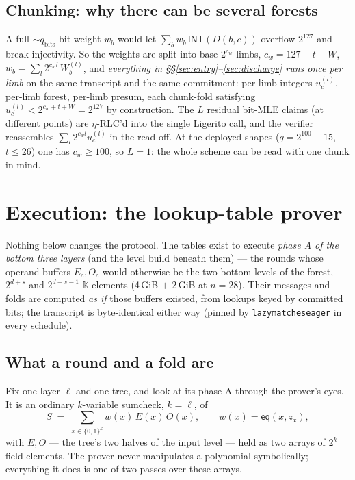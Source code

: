 \documentclass[11pt]{article}
\newcommand{\K}{\mathbb{K}}            %
\newcommand{\bits}{\{0,1\}}
\newcommand{\INT}{\mathsf{INT}}
\newcommand{\eq}{\mathsf{eq}}
\newcommand{\cw}{c_w}
\newcommand{\code}[1]{{\def\_{\textunderscore\allowbreak}\texttt{#1}}}
\theoremstyle{definition}
\begin{document}
\subsection{Chunking: why there can be several forests}
\label{sec:chunks}

A full ${\sim}q_{\mathrm{bits}}$-bit weight $w_b$ would let
$\sum_b w_b\,\INT(D(b,c))$ overflow $2^{127}$ and break injectivity.  So
the weights are split into base-$2^{\cw}$ limbs, $\cw = 127 - t - W$,
$w_b = \sum_l 2^{\cw l}\, W^{(l)}_b$, and \emph{everything in
\S\S\ref{sec:entry}--\ref{sec:discharge} runs once per limb} on the same
transcript and the same commitment: per-limb integers $u^{(l)}_c$,
per-limb forest, per-limb presum, each chunk-fold satisfying
$u^{(l)}_c < 2^{\cw + t + W} = 2^{127}$ by construction.  The $L$
residual bit-MLE claims (at different points) are $\eta$-RLC'd into the
single Ligerito call, and the verifier reassembles
$\sum_l 2^{\cw l} u^{(l)}_c$ in the read-off.  At the deployed shapes
($q = 2^{100} - 15$, $t \le 26$) one has $\cw \ge 100$, so $L = 1$: the
whole scheme can be read with one chunk in mind.

\section{Execution: the lookup-table prover}
\label{sec:luts}

Nothing below changes the protocol.  The tables exist to execute
\emph{phase A of the bottom three layers} (and the level build beneath
them) --- the rounds whose operand buffers $E_c, O_c$ would otherwise be
the two bottom levels of the forest, $2^{d+s}$ and $2^{d+s-1}$
$\K$-elements (4\,GiB $+$ 2\,GiB at $n = 28$).  Their messages and folds
are computed \emph{as if} those buffers existed, from lookups keyed by
committed bits; the transcript is byte-identical either way (pinned by
\code{lazy\_matches\_eager} in every schedule).

\subsection{What a round and a fold are}
\label{sec:roundfold}

Fix one layer $\ell$ and one tree, and look at its phase A through the
prover's eyes.  It is an ordinary $k$-variable sumcheck, $k = \ell$, of
\[
  S \;=\; \sum_{x \in \bits^k} w(x)\, E(x)\, O(x),
  \qquad w(x) = \eq(x, z_x),
\]
with $E, O$ --- the tree's two halves of the input level --- held as two
arrays of $2^k$ field elements.  The prover never manipulates a
polynomial symbolically; everything it does is one of two passes over
these arrays.
\end{document}
